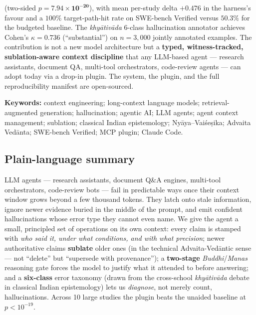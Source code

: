 \begin{tcolorbox}[colback=gray!4,colframe=gray!50,boxrule=0.4pt,arc=2pt,
left=8pt,right=8pt,top=4pt,bottom=4pt]
(two-sided $p = \mathbf{7.94 \times 10^{-20}}$), with mean per-study
delta $\mathbf{+0.476}$ in the harness's favour and a $100\%$
target-path-hit rate on SWE-bench Verified versus $50.3\%$ for the
budgeted baseline. The \textit{khy\=ativ\=ada} 6-class hallucination
annotator achieves Cohen's $\kappa = \mathbf{0.736}$ (``substantial'')
on $n = 3{,}000$ jointly annotated examples. The contribution is not a
new model architecture but a \textbf{typed, witness-tracked,
sublation-aware context discipline} that any LLM-based agent ---
research assistants, document QA, multi-tool orchestrators, code-review
agents --- can adopt today via a drop-in plugin. The system, the
plugin, and the full reproducibility manifest are open-sourced.
\end{tcolorbox}

\noindent\textbf{Keywords:} context engineering; long-context language
models; retrieval-augmented generation; hallucination; agentic AI; LLM
agents; agent context management; sublation; classical Indian
epistemology; Ny\=aya--Vai\'se\d{s}ika; Advaita Ved\=anta; SWE-bench
Verified; MCP plugin; Claude Code.

\subsection*{Plain-language summary}\label{plain-language-summary}

LLM agents --- research assistants, document Q\&A engines, multi-tool
orchestrators, code-review bots --- fail in predictable ways once their
context window grows beyond a few thousand tokens. They latch onto stale
information, ignore newer evidence buried in the middle of the prompt,
and emit confident hallucinations whose error type they cannot even name.
We give the agent a small, principled set of operations on its own
context: every claim is stamped with \emph{who said it, under what conditions,
and with what precision}; newer authoritative claims \textbf{sublate} older
ones (in the technical Advaita-Vedāntic sense --- not ``delete'' but
``supersede with provenance''); a \textbf{two-stage} \emph{Buddhi}/\emph{Manas} reasoning
gate forces the model to justify what it attended to before answering;
and a \textbf{six-class} error taxonomy (drawn from the cross-school
\emph{khyātivāda} debate in classical Indian epistemology) lets us \emph{diagnose},
not merely count, hallucinations. Across 10 large studies the plugin
beats the unaided baseline at \(p < 10^{-19}\).
